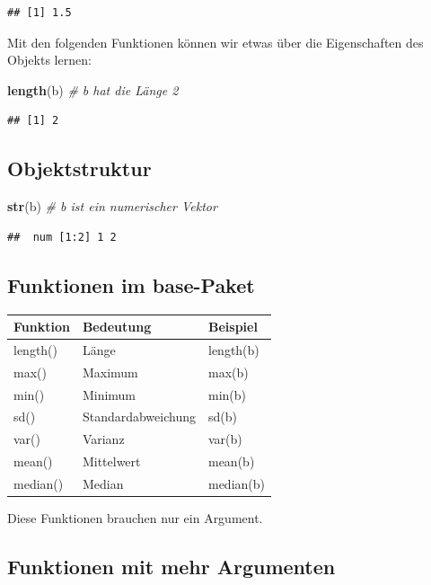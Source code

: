 \documentclass[]{article}
\newenvironment{Shaded}{\begin{snugshade}}{\end{snugshade}}
\newcommand{\KeywordTok}[1]{\textcolor[rgb]{0.13,0.29,0.53}{\textbf{{#1}}}}
\newcommand{\CommentTok}[1]{\textcolor[rgb]{0.56,0.35,0.01}{\textit{{#1}}}}
\newcommand{\NormalTok}[1]{{#1}}
\begin{document}
\begin{verbatim}
## [1] 1.5
\end{verbatim}

Mit den folgenden Funktionen können wir etwas über die Eigenschaften des
Objekts lernen:

\begin{Shaded}
\begin{Highlighting}[]
\KeywordTok{length}\NormalTok{(b) }\CommentTok{# b hat die Länge 2}
\end{Highlighting}
\end{Shaded}

\begin{verbatim}
## [1] 2
\end{verbatim}

\subsection{Objektstruktur}\label{objektstruktur}

\begin{Shaded}
\begin{Highlighting}[]
\KeywordTok{str}\NormalTok{(b) }\CommentTok{# b ist ein numerischer Vektor}
\end{Highlighting}
\end{Shaded}

\begin{verbatim}
##  num [1:2] 1 2
\end{verbatim}

\subsection{Funktionen im base-Paket}\label{funktionen-im-base-paket}

\begin{longtable}[]{@{}lll@{}}
\toprule
Funktion & Bedeutung & Beispiel\tabularnewline
\midrule
\endhead
length() & Länge & length(b)\tabularnewline
max() & Maximum & max(b)\tabularnewline
min() & Minimum & min(b)\tabularnewline
sd() & Standardabweichung & sd(b)\tabularnewline
var() & Varianz & var(b)\tabularnewline
mean() & Mittelwert & mean(b)\tabularnewline
median() & Median & median(b)\tabularnewline
\bottomrule
\end{longtable}

Diese Funktionen brauchen nur ein Argument.

\subsection{Funktionen mit mehr
Argumenten}\label{funktionen-mit-mehr-argumenten}
\end{document}
